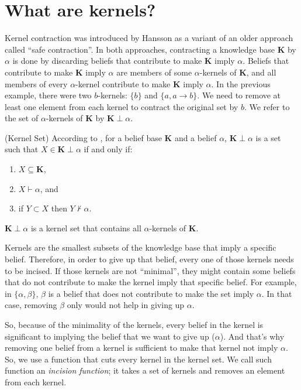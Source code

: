 \section{What are kernels?}
Kernel contraction was introduced by Hansson\cite{kernel} as a variant of an older approach called ``safe contraction''\cite{safe}. In both approaches, contracting a knowledge base \textbf{K} by $\alpha$ is done by discarding beliefs that contribute to make \textbf{K} imply $\alpha$. Beliefs that contribute to make \textbf{K} imply $\alpha$ are members of some $\alpha$-kernels of \textbf{K}, and all members of every $\alpha$-kernel contribute to make \textbf{K} imply $\alpha$. In the previous example, there were two $b$-kernels: $\lbrace b \rbrace$ and $\lbrace a, a \rightarrow b \rbrace$. We need to remove at least one element from each kernel to contract the original set by $b$. We refer to the set of $\alpha$-kernels of \textbf{K} by $\textbf{K} \perp \alpha$.
\begin{defn}(Kernel Set)
According to \cite{hansson}, for a belief base \textbf{K} and a belief $\alpha$, $\textbf{K} \perp \alpha$ is a set such that $X \in \textbf{K} \perp \alpha$ if and only if:
\begin{enumerate}
\item $X \subseteq \textbf{K}$,
\item $X \vdash \alpha$, and
\item if $Y \subset X$ then $Y \nvdash \alpha$.
\end{enumerate}
$\textbf{K} \perp \alpha$ is a kernel set that contains all $\alpha$-kernels of \textbf{K}.
\end{defn}
Kernels are the smallest subsets of the knowledge base that imply a specific belief. Therefore, in order to give up that belief, every one of those kernels needs to be incised. If those kernels are not ``minimal'', they might contain some beliefs that do not contribute to make the kernel imply that specific belief. For example, in $\lbrace \alpha, \beta \rbrace$, $\beta$ is a belief that does not contribute to make the set imply $\alpha$. In that case, removing $\beta$ only would not help in giving up $\alpha$. 

So, because of the minimality of the kernels, every belief in the kernel is significant to implying the belief that we want to give up ($\alpha$). And that's why removing one belief from a kernel is sufficient to make that kernel not imply $\alpha$. So, we use a function that cuts every kernel in the kernel set. We call such function an \textit{incision function}; it takes a set of kernels and removes an element from each kernel. 

